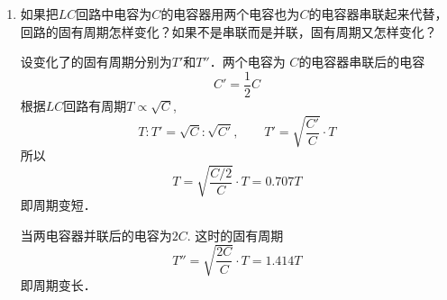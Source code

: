 \begin{enumerate}
	\item 如果把$LC$回路中电容为$C$的电容器用两个电容也为$C$的电容器串联起来代替，回路的固有周期怎样变化？如果不是串联而是并联，固有周期又怎样变化？

    \begin{solution}
设变化了的固有周期分别为$T'$和$T''$．两个电容为
$C$的电容器串联后的电容
\[C'=\frac{1}{2}C\]
根据$LC$回路有周期$T\propto \sqrt{C}$,
\[T:T'=\sqrt{C}:\sqrt{C'},\qquad T'=\sqrt{\frac{C'}{C}}\cdot T\]
所以
\[T=\sqrt{\frac{C/2}{C}}\cdot T=0.707T\]
即周期变短．

当两电容器并联后的电容为$2C$. 这时的固有周期
\[T''=\sqrt{\frac{2C}{C}}\cdot T=1.414T\]
即周期变长．
    \end{solution}
    
\end{enumerate}



